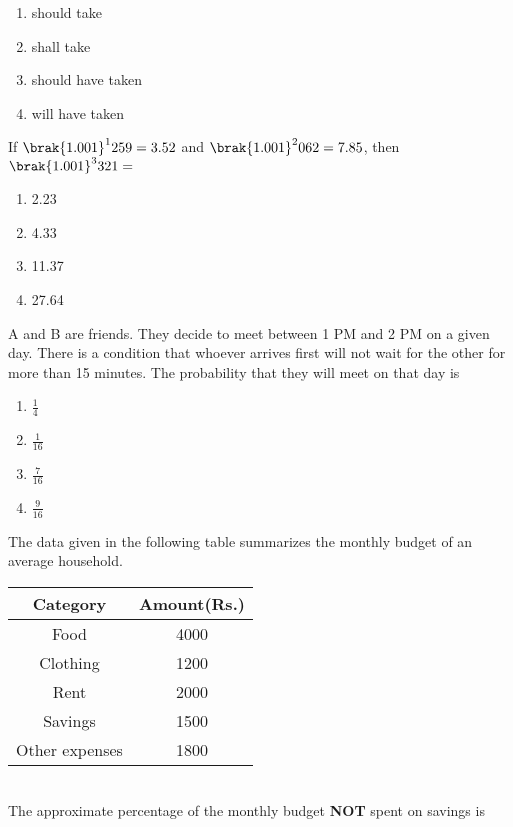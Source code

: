 		\begin{enumerate}
			\item should take
			\item shall take
			\item should have taken
			\item will have taken
		\end{enumerate}
\item If $\brak{1.001}^1259 = 3.52$ and $\brak{1.001}^2062 = 7.85$, then $\brak{1.001}^3321 =$
	\begin{enumerate}                                                                               
		\item 2.23
		\item 4.33
		\item 11.37
		\item 27.64
	\end{enumerate}
\item A and B are friends. They decide to meet between 1 PM and 2 PM on a given day. There is a condition that whoever arrives first will not wait for the other for more than 15 minutes. The probability that they will meet on that day is
	\begin{enumerate}
		\item $\frac{1}{4}$
		\item $\frac{1}{16}$
		\item $\frac{7}{16}$
		\item $\frac{9}{16}$
	\end{enumerate}
\item The data given in the following table summarizes the monthly budget of an average household.
	\begin{table}[h!]
		\centering
		\begin{center}
			\begin{tabular}{|c|c|}
				\hline
				\textbf{Category} & \textbf{Amount(Rs.)} \\
				\hline
				Food & 4000 \\
				\hline
				Clothing & 1200 \\
				\hline
				Rent & 2000 \\
				\hline
				Savings & 1500 \\
				\hline
				Other expenses & 1800 \\
				\hline
			\end{tabular}
		\end{center}
	\end{table} \\
		The approximate percentage of the monthly budget \textbf{NOT} spent on savings is
